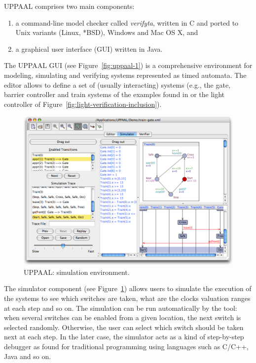 UPPAAL comprises two main components:
\begin{enumerate}
  
  \item a command-line model checker called \emph{verifyta}, written in C and ported to Unix variants (Linux, *BSD), Windows and Mac OS X, and
  
  \item a graphical user interface (GUI) written in Java.
  
\end{enumerate}
The UPPAAL GUI (see Figure~\ref{fig:uppaal-1}) is a comprehensive environment for modeling, simulating and verifying systems represented as timed automata. The editor allows to define a set of (usually interacting) systems (e.g., the gate, barrier controller and train systems of the examples found in \cite{RADLD94} or the light controller of Figure~\ref{fig:light-verification-inclusion}).\\

\begin{figure}[htbp]
    \centering
    \includegraphics[width=\textwidth]{content/timed-automata/uppaal-2}
    \caption{UPPAAL: simulation environment.}
    \label{fig:uppaal-2}
\end{figure}

The simulator component (see Figure~\ref{fig:uppaal-2}) allows users to simulate the execution of the systems to see which switches are taken, what are the clocks valuation ranges at each step and so on. The simulation can be run automatically by the tool: when several switches can be enabled from a given location, the next switch is selected randomly. Otherwise, the user can select which switch should be taken next at each step. In the later case, the simulator acts as a kind of step-by-step debugger as found for traditional programming using languages such as C/C++, Java and so on.\\


